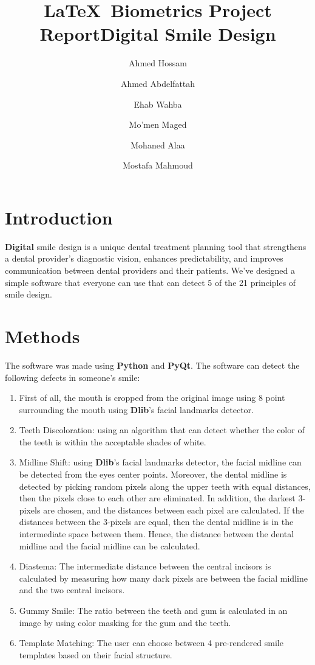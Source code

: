 \documentclass[conference,twocolumn]{IEEEtran}
\begin{document}
\title{\LaTeX\ Biometrics Project Report}

\title{Digital Smile Design}
\author[1]{Ahmed Hossam}
\author[1]{Ahmed Abdelfattah }
\author[1]{Ehab Wahba }
\author[1]{Mo'men Maged}
\author[1]{Mohaned Alaa }
\author[1]{Mostafa Mahmoud}


\renewcommand\Authands{ and }

\maketitle
\pagestyle{plain}

\section{\textbf{Introduction}}
\textbf{Digital} smile design is a unique dental treatment planning tool that strengthens a dental provider's diagnostic vision, enhances predictability, and improves communication between dental providers and their patients. We've designed a simple software that everyone can use that can detect 5 of the 21 principles of smile design.
\section{\textbf{Methods}}
 The software was made using \textbf{Python} and \textbf{PyQt}. The software can detect the following defects in someone's smile:
\begin{enumerate}
    \item First of all, the mouth is cropped from the original image using 8 point surrounding the mouth using \textbf{Dlib}'s facial landmarks detector.
    \item Teeth Discoloration: using an algorithm that can detect whether the color of the teeth is within the acceptable shades of white.
    \item Midline Shift: using \textbf{Dlib}'s facial landmarks detector, the facial midline can be detected from the eyes center points. Moreover, the dental midline is detected by picking random pixels along the upper teeth with equal distances, then the pixels close to each other are eliminated. In addition, the darkest 3-pixels are chosen, and the distances between each pixel are calculated. If the distances between the 3-pixels are equal, then the dental midline is in the intermediate space between them. Hence, the distance between the dental midline and the facial midline can be calculated.
    \item Diastema: The intermediate distance between the central incisors is calculated by measuring how many dark pixels are between the facial midline and the two central incisors.
    \item Gummy Smile: The ratio between the teeth and gum is calculated in an image by using color masking for the gum and the teeth.
    \item Template Matching: The user can choose between 4 pre-rendered smile templates based on their facial structure.
    
\end{enumerate}
\end{document}
